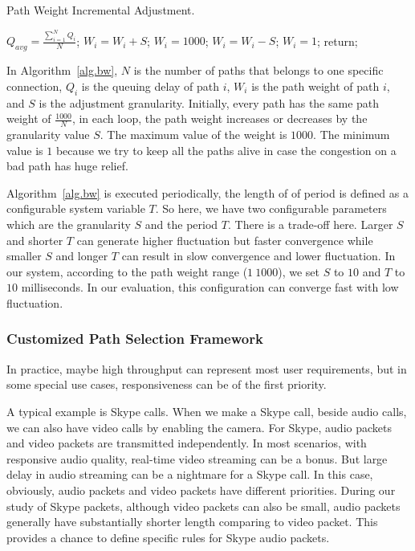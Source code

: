 \begin{algorithm}
\caption{Path Weight Incremental Adjustment.}
\label{alg.bw}
\begin{algorithmic}[1]
\STATE  $Q_{avg}= \frac{\sum_{i=1}^{N}Q_i}{N}$;
    \STATE $W_i=W_i+S$;
	    \STATE $W_i=1000$;
	\ENDIF
\ELSE
    \STATE $W_i=W_i-S$;
	    \STATE $W_i=1$;
	\ENDIF
\ENDIF
\STATE return;
\end{algorithmic}
\end{algorithm}

In Algorithm~\ref{alg.bw}, $N$ is the number of paths that belongs to one specific connection, $Q_i$ is the queuing delay of path $i$, $W_i$ is the path weight of path $i$, and $S$ is the adjustment granularity. Initially, every path has the same path weight of $\frac{1000}{N}$, in each loop, the path weight increases or decreases by the granularity value $S$. The maximum value of the weight is $1000$. The minimum value is $1$ because we try to keep all the paths alive in case the congestion on a bad path has huge relief.

Algorithm~\ref{alg.bw} is executed periodically, the length of of period is defined as a configurable system variable $T$. So here, we have two configurable parameters which are the granularity $S$ and the period $T$. There is a trade-off here. Larger $S$ and shorter $T$ can generate higher fluctuation but faster convergence while smaller $S$ and longer $T$ can result in slow convergence and lower fluctuation. In our system, according to the path weight range ($1~1000$), we set $S$ to $10$ and $T$ to $10$ milliseconds. In our evaluation, this configuration can converge fast with low fluctuation.

\subsubsection{Customized Path Selection Framework}
\label{sec:resp}
In practice, maybe high throughput can represent most user requirements, but in some special use cases, responsiveness can be of the first priority. 

A typical example is Skype calls. When we make a Skype call, beside audio calls, we can also have video calls by enabling the camera. For Skype, audio packets and video packets are transmitted independently. In most scenarios, with responsive audio quality, real-time video streaming can be a bonus. But large delay in audio streaming can be a nightmare for a Skype call. In this case, obviously, audio packets and video packets have different priorities. During our study of Skype packets, although video packets can also be small, audio packets generally have substantially shorter length comparing to video packet. This provides a chance to define specific rules for Skype audio packets.

